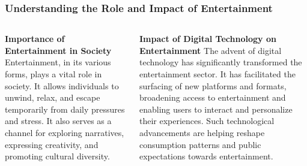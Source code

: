 \documentclass[5pt]{beamer}
\begin{document}
\begin{frame}
\frametitle{Understanding the Role and Impact of Entertainment}
\begin{columns}
\begin{column}{0.45\textwidth}
\begin{block}{\textbf{Importance of Entertainment in Society}}
Entertainment, in its various forms, plays a vital role in society. It allows individuals to unwind, relax, and escape temporarily from daily pressures and stress. It also serves as a channel for exploring narratives, expressing creativity, and promoting cultural diversity.
\end{block}
\end{column}
\begin{column}{0.45\textwidth}
\begin{block}{\textbf{Impact of Digital Technology on Entertainment}}
The advent of digital technology has significantly transformed the entertainment sector. It has facilitated the surfacing of new platforms and formats, broadening access to entertainment and enabling users to interact and personalize their experiences. Such technological advancements are helping reshape consumption patterns and public expectations towards entertainment.
\end{block}
\end{column}
\end{columns}
\end{frame}
\end{document}
